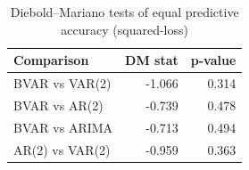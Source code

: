 \begin{table}

\caption{\label{tab:dm-tests}Diebold--Mariano tests of equal predictive accuracy (squared-loss)}
\centering
\begin{tabular}[t]{lrr}
\toprule
Comparison & DM stat & p-value\\
\midrule
BVAR vs VAR(2) & -1.066 & 0.314\\
BVAR vs AR(2) & -0.739 & 0.478\\
BVAR vs ARIMA & -0.713 & 0.494\\
AR(2) vs VAR(2) & -0.959 & 0.363\\
\bottomrule
\end{tabular}
\end{table}
